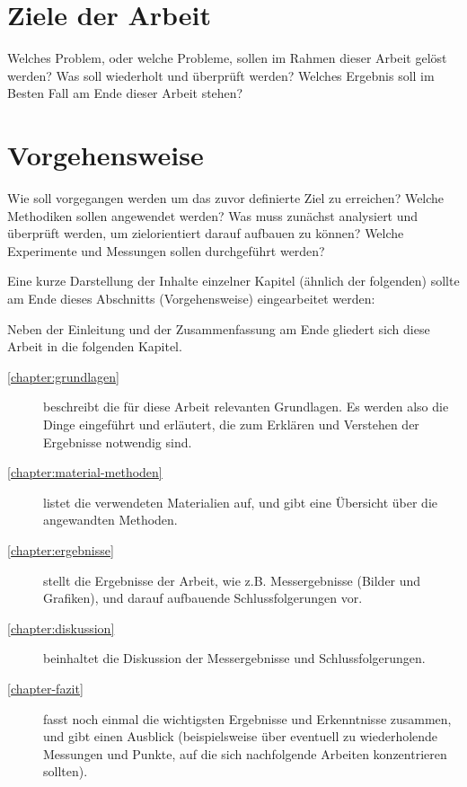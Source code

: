\section{Ziele der Arbeit}

Welches Problem, oder welche Probleme, sollen im Rahmen dieser Arbeit gelöst werden? Was soll wiederholt und überprüft werden? Welches Ergebnis soll im Besten Fall am Ende dieser Arbeit stehen?

\section{Vorgehensweise}

Wie soll vorgegangen werden um das zuvor definierte Ziel zu erreichen? Welche Methodiken sollen angewendet werden? Was muss zunächst analysiert und überprüft werden, um zielorientiert darauf aufbauen zu können? Welche Experimente und Messungen sollen durchgeführt werden?

Eine kurze Darstellung der Inhalte einzelner Kapitel (ähnlich der folgenden) sollte am Ende dieses Abschnitts (Vorgehensweise) eingearbeitet werden:

Neben der Einleitung und der Zusammenfassung am Ende gliedert sich diese Arbeit in die folgenden Kapitel.
\begin{description}
  \item[\ref{chapter:grundlagen}] beschreibt die für diese Arbeit relevanten Grundlagen. Es werden also die Dinge eingeführt und erläutert, die zum Erklären und Verstehen der Ergebnisse notwendig sind.
  \item[\ref{chapter:material-methoden}] listet die verwendeten Materialien auf, und gibt eine Übersicht über die angewandten Methoden.
  \item[\ref{chapter:ergebnisse}] stellt die Ergebnisse der Arbeit, wie z.B. Messergebnisse (Bilder und Grafiken), und darauf aufbauende Schlussfolgerungen vor.
  \item[\ref{chapter:diskussion}] beinhaltet die Diskussion der Messergebnisse und Schlussfolgerungen.
  \item[\ref{chapter-fazit}] fasst noch einmal die wichtigsten Ergebnisse und Erkenntnisse zusammen, und gibt einen Ausblick (beispielsweise über eventuell zu wiederholende Messungen und Punkte, auf die sich nachfolgende Arbeiten konzentrieren sollten).
\end{description}

